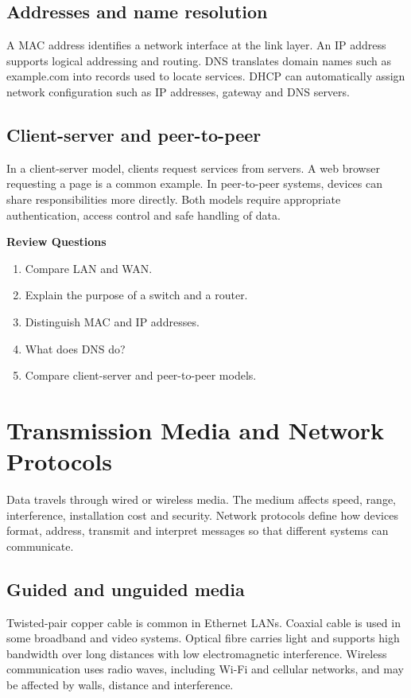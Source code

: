 \documentclass[11pt,openany,oneside]{book}
\newcommand{\reviewtitle}{\par\noindent\textbf{\color{Navy}Review Questions}\par}
\begin{document}
\section{Addresses and name resolution}
A MAC address identifies a network interface at the link layer. An IP address supports logical addressing and routing. DNS translates domain names such as example.com into records used to locate services. DHCP can automatically assign network configuration such as IP addresses, gateway and DNS servers.

\section{Client-server and peer-to-peer}
In a client-server model, clients request services from servers. A web browser requesting a page is a common example. In peer-to-peer systems, devices can share responsibilities more directly. Both models require appropriate authentication, access control and safe handling of data.

\reviewtitle
\begin{enumerate}
\item Compare LAN and WAN.
\item Explain the purpose of a switch and a router.
\item Distinguish MAC and IP addresses.
\item What does DNS do?
\item Compare client-server and peer-to-peer models.
\end{enumerate}

\chapter{Transmission Media and Network Protocols}
Data travels through wired or wireless media. The medium affects speed, range, interference, installation cost and security. Network protocols define how devices format, address, transmit and interpret messages so that different systems can communicate.

\section{Guided and unguided media}
Twisted-pair copper cable is common in Ethernet LANs. Coaxial cable is used in some broadband and video systems. Optical fibre carries light and supports high bandwidth over long distances with low electromagnetic interference. Wireless communication uses radio waves, including Wi-Fi and cellular networks, and may be affected by walls, distance and interference.
\end{document}
